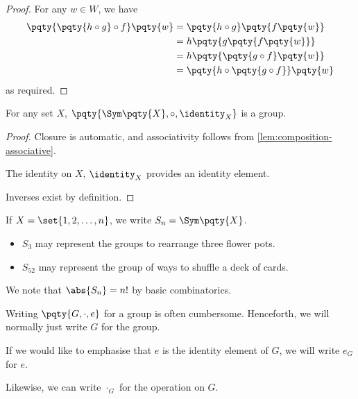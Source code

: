 \begin{proof}
    For any \(w \in W\), we have
    \begin{align*}
        \pqty{\pqty{h \circ g} \circ f} \pqty{w} &= \pqty{h \circ g} \pqty{f\pqty{w}} \\
        &= h \pqty{g \pqty{f \pqty{w}}} \\
        &= h \pqty{\pqty{g \circ f} \pqty{w}} \\
        &= \pqty{h \circ \pqty{g \circ f}} \pqty{w}
    \end{align*}
    as required.
\end{proof}

\begin{proposition}
    \label{prop:symmetry-group}%
    For any set \(X\), \(\pqty{\Sym\pqty{X}, \circ, \identity_X}\) is a group.
\end{proposition}

\begin{proof}
    Closure is automatic, and associativity follows from \autoref{lem:composition-associative}.

    The identity on \(X\), \(\identity_X\) provides an identity element.

    Inverses exist by definition.
\end{proof}

\begin{definition}[\(S_n\)]
    \label{def:s-n}%
    If \(X = \set{1, 2, \ldots, n}\), we write \(S_n = \Sym\pqty{X}\).
\end{definition}

\begin{examples*}
    \begin{itemize}
        \item \(S_3\) may represent the groups to rearrange three flower pots.
        \item \(S_{52}\) may represent the group of ways to shuffle a deck of cards.
    \end{itemize}
\end{examples*}

\begin{remark}
    We note that \(\abs{S_n} = n!\) by basic combinatorics.
\end{remark}

\begin{notation}
    Writing \(\pqty{G, \cdot, e}\) for a group is often cumbersome. Henceforth, we will normally just write \(G\) for the group.
    
    If we would like to emphasise that \(e\) is the identity element of \(G\), we will write \(e_G\) for \(e\).

    Likewise, we can write \(\cdot_G\) for the operation on \(G\).
\end{notation}

